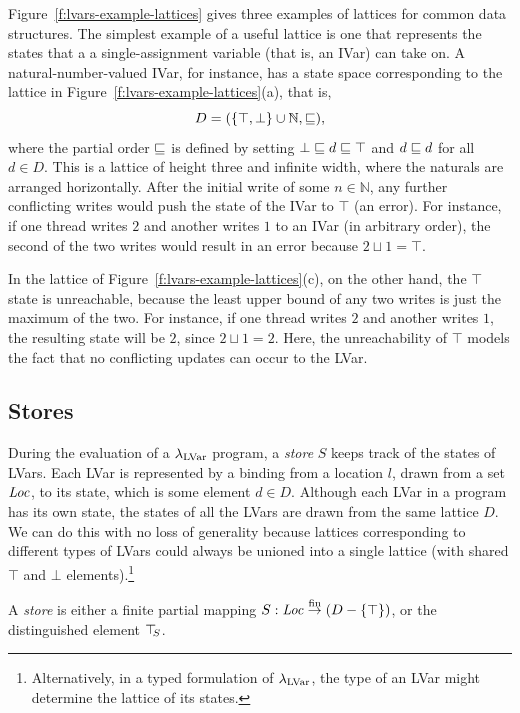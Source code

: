 Figure~\ref{f:lvars-example-lattices} gives three examples of lattices
for common data structures.  The simplest example of a useful
lattice is one that represents the states that a a single-assignment
variable (that is, an IVar) can take on.  A natural-number-valued
IVar, for instance, has a state space corresponding to the lattice in
Figure~\ref{f:lvars-example-lattices}(a), that is,
\begin{displaymath}
  D = (\lbrace \top, \bot \rbrace \cup \mathbb{N}, \sqsubseteq), 
\end{displaymath}
where the partial order $\sqsubseteq$ is defined by setting $\bot
\sqsubseteq d \sqsubseteq \top$ and $d \sqsubseteq d$ for all $d \in D$.  This
is a lattice of height three and infinite width, where the naturals
are arranged horizontally.  After the initial write of some $n \in
\mathbb{N}$, any further conflicting writes would push the state of
the IVar to $\top$ (an error).  For instance, if one thread writes $2$
and another writes $1$ to an IVar (in arbitrary order), the second of
the two writes would result in an error because $2 \sqcup 1 = \top$.

In the lattice of Figure~\ref{f:lvars-example-lattices}(c), on the
other hand, the $\top$ state is unreachable, because the least upper
bound of any two writes is just the maximum of the two.  For instance,
if one thread writes $2$ and another writes $1$, the resulting state
will be $2$, since $2 \sqcup 1 = 2$.  Here, the unreachability of
$\top$ models the fact that no conflicting updates can occur to the
LVar.

\subsection{Stores}\label{subsection:lvars-stores}

During the evaluation of a $\lambda_{\textrm{LVar}}$ program, a \emph{store} $S$
keeps track of the states of LVars.  Each LVar is represented by a
binding from a location $l$, drawn from a set $\mathit{Loc}$, to its state,
which is some element $d \in D$.  Although each LVar in a program has
its own state, the states of all the LVars are drawn from the same
lattice $D$.  We can do this with no loss of generality because
lattices corresponding to different types of LVars could always be
unioned into a single lattice (with shared $\top$ and $\bot$
elements).\footnote{Alternatively, in a typed formulation of
  $\lambda_{\textrm{LVar}}$, the type of an LVar might determine the lattice of
  its states.}

\begin{definition}\label{def:lvars-store}
A \emph{store} is either a finite partial mapping $S : \mathit{Loc} \stackrel{\textrm{fin}}{\rightarrow}
(D-\lbrace \top \rbrace)$, or the distinguished element $\top\hspace{-0.85mm}_{S}$.
\end{definition}

